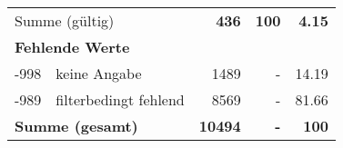 \begin{longtable}{lXrrr}
     \midrule
     \multicolumn{2}{l}{Summe (gültig)} &
       \textbf{\num{436}} &
     \textbf{100} &
       \textbf{\num[round-mode=places,round-precision=2]{4,15}} \\
     \multicolumn{5}{l}{\textbf{Fehlende Werte}}\\
       -998 &
       keine Angabe &
         \num{1489} &
        - &
         \num[round-mode=places,round-precision=2]{14,19} \\
       -989 &
       filterbedingt fehlend &
         \num{8569} &
        - &
         \num[round-mode=places,round-precision=2]{81,66} \\
     \midrule
     \multicolumn{2}{l}{\textbf{Summe (gesamt)}} &
          \textbf{\num{10494}} &
        \textbf{-} &
        \textbf{100} \\
     \bottomrule
     \end{longtable}
     
